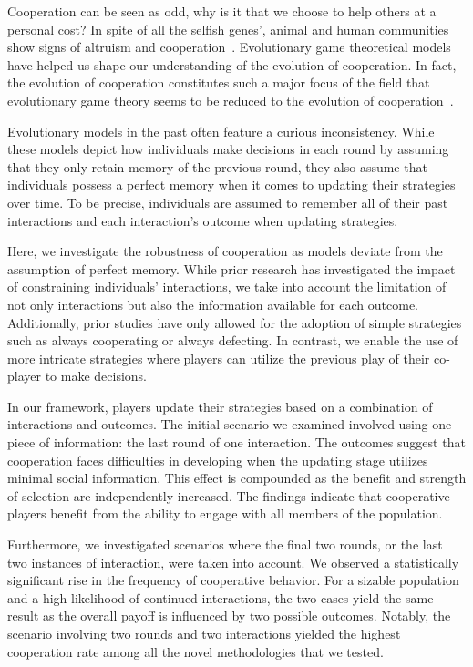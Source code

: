 \documentclass[11pt]{article}
\theoremstyle{plainCl1}
\theoremstyle{plainCl2}
\begin{document}
Cooperation can be seen as odd, why is it that we choose to help others at a
personal cost? In spite of all the selfish genes', animal and human communities
show signs of altruism and cooperation~\cite{milinski1987tit, kerr2002local,
carter2020development}. Evolutionary game theoretical models have helped us
shape our understanding of the evolution of cooperation. In fact, the evolution
of cooperation constitutes such a major focus of the field that evolutionary
game theory seems to be reduced to the evolution of
cooperation~\cite{Traulsen:PhilTrans:2022}. 

Evolutionary models in the past often feature a curious inconsistency. While
these models depict how individuals make decisions in each round by assuming
that they only retain memory of the previous round, they also assume that
individuals possess a perfect memory when it comes to updating their strategies
over time. To be precise, individuals are assumed to remember all of their past
interactions and each interaction's outcome when updating strategies.

Here, we investigate the robustness of cooperation as models deviate
from the assumption of perfect memory. While prior research has investigated the
impact of constraining individuals' interactions, we take into account the
limitation of not only interactions but also the information available for each
outcome. Additionally, prior studies have only allowed for the adoption of
simple strategies such as always cooperating or always defecting. In contrast,
we enable the use of more intricate strategies where players can utilize the
previous play of their co-player to make decisions.

In our framework, players update their strategies based on a combination of
interactions and outcomes. The initial scenario we examined involved using one
piece of information: the last round of one interaction. The outcomes suggest
that cooperation faces difficulties in developing when the updating stage
utilizes minimal social information. This effect is compounded as the benefit
and strength of selection are independently increased. The findings indicate
that cooperative players benefit from the ability to engage with all members of
the population.

Furthermore, we investigated scenarios where the final two rounds, or the last
two instances of interaction, were taken into account. We observed a
statistically significant rise in the frequency of cooperative behavior. For a
sizable population and a high likelihood of continued interactions, the two
cases yield the same result as the overall payoff is influenced by two possible
outcomes. Notably, the scenario involving two rounds and two interactions
yielded the highest cooperation rate among all the novel methodologies that we
tested.\\
\end{document}

